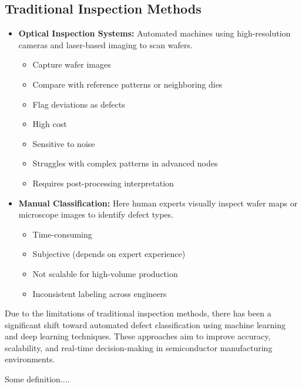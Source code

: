 \subsection{Traditional Inspection Methods}
\begin{itemize}
     \item \textbf{Optical Inspection Systems:}
     Automated machines using high-resolution cameras and laser-based imaging to scan wafers.
     \begin{itemize} How they work:
     \item Capture wafer images
     \item Compare with reference patterns or neighboring dies
     \item Flag deviations as defects
     \end{itemize}
      \begin{itemize} Limitations:
      \item High cost
      \item Sensitive to noise
      \item Struggles with complex patterns in advanced nodes
      \item Requires post-processing interpretation
      \end{itemize}

     \item \textbf{Manual Classification:}  
       Here human experts visually inspect wafer maps or microscope images to identify defect types.
       \begin{itemize} Limitations:
           \item Time-consuming
           \item Subjective (depends on expert experience)
            \item Not scalable for high-volume production
            \item Inconsistent labeling across engineers
       \end{itemize}
\end{itemize}
Due to the limitations of traditional inspection methods, there has been a significant shift toward automated defect classification using machine learning and deep learning techniques. These approaches aim to improve accuracy, scalability, and real-time decision-making in semiconductor manufacturing environments.

\begin{definition}\label{abc}
Some definition....
\end{definition}

